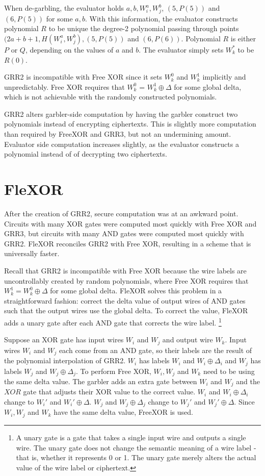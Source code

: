 When de-garbling, the evaluator holds $a, b, W_i^a, W_j^b$, $(5, P(5))$ and $(6, P(5))$ for some $a,b$.
With this information, the evaluator constructs polynomial $R$ to be unique the degree-2 polynomial passing through points $(2a + b + 1, H(W_i^a, W_j^b), (5, P(5))$ and $(6, P(6))$.
Polynomial $R$ is either $P$ or $Q$, depending on the values of $a$ and $b$.
The evaluator simply sets $W_k^*$ to be $R(0)$.

GRR2 is incompatible with Free XOR since it sets $W_k^0$ and $W_k^1$ implicitly and unpredictably.
Free XOR requires that $W_k^0$ = $W_k^1 \oplus \Delta$ for some global delta, which is not achievable with the randomly constructed polynomials.

GRR2 alters garbler-side computation by having the garbler construct two polynomials instead of encrypting ciphertexts.
This is slightly more computation than required by FreeXOR and GRR3, but not an undermining amount.
Evaluator side computation increases slightly, as the evaluator constructs a polynomial instead of of decrypting two ciphertexts.


\section{FleXOR}
After the creation of GRR2, secure computation was at an awkward point.
Circuits with many XOR gates were computed most quickly with Free XOR and GRR3, but circuits with many AND gates were computed most quickly with GRR2.
FleXOR reconciles GRR2 with Free XOR, resulting in a scheme that is universally faster.

Recall that GRR2 is incompatible with Free XOR because the wire labels are uncontrollably created by random polynomials, where Free XOR requires that $W_k^1 = W_k^0 \oplus \Delta$ for some global delta.
FleXOR solves this problem in a straightforward fashion: correct the delta value of output wires of AND gates such that the output wires use the global delta.
To correct the value, FleXOR adds a unary gate after each AND gate that corrects the wire label. \footnote{A unary gate is a gate that takes a single input wire and outputs a single wire. The unary gate does not change the semantic meaning of a wire label - that is, whether it represents 0 or 1. The unary gate merely alters the actual value of the wire label or ciphertext.}

Suppose an XOR gate has input wires $W_i$ and $W_j$ and output wire $W_k$.
Input wires $W_i$ and $W_j$ each come from an AND gate, so their labels are the result of the polynomial interpolation of GRR2.
$W_i$ has labels $W_i$ and $W_i \oplus \Delta_i$ and $W_j$ has labels $W_j$ and $W_j \oplus \Delta_j$.
To perform Free XOR, $W_i,W_j$ and $W_k$ need to be using the same delta value. 
The garbler adds an extra gate between $W_i$ and $W_j$ and the $XOR$ gate that adjusts their XOR value to the correct value.
$W_i$ and $W_i \oplus \Delta_i$ change to $W_i'$ and $W_i' \oplus \Delta$.
$W_j$ and $W_j \oplus \Delta_j$ change to $W_j'$ and $W_j' \oplus \Delta$.
Since $W_i, W_j$ and $W_k$ have the same delta value, FreeXOR is used.


